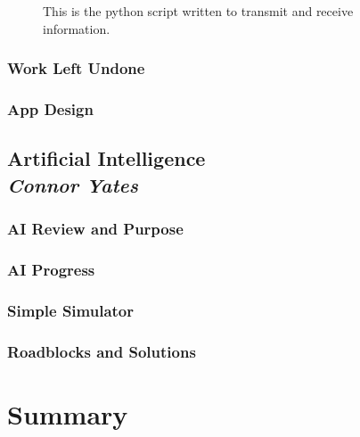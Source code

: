 \documentclass[draftclsnofoot,onecolumn,letterpaper,10pt]{IEEEtran}
\begin{document}
\begin{figure}
\label{fig:python}
\caption{This is the python script written to transmit and receive information.}
\end{figure}

\vfill
\clearpage
\subsubsection{Work Left Undone}

\subsubsection{App Design}


\subsection{Artificial Intelligence\\{\em\textbf{Connor Yates}}}
\subsubsection{AI Review and Purpose}


\subsubsection{AI Progress}

\subsubsection{Simple Simulator}

\subsubsection{Roadblocks and Solutions}


\section{Summary}
\end{document}
